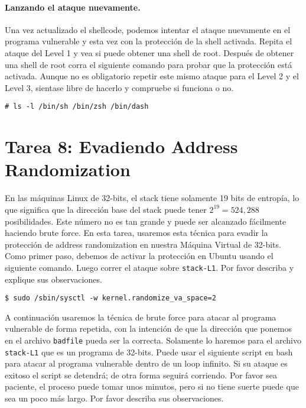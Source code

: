 \paragraph{Lanzando el ataque nuevamente.}
Una vez actualizado el shellcode, podemos intentar el ataque nuevamente en el programa vulnerable y esta vez con la protección de la shell activada. Repita el ataque del Level 1 y vea si puede obtener una shell de root. Después de obtener una shell de root corra el siguiente comando para probar que la protección está activada. Aunque no es obligatorio repetir este mismo ataque para el Level 2 y el Level 3, sientase libre de hacerlo y compruebe si funciona o no.

\begin{lstlisting}
# ls -l /bin/sh /bin/zsh /bin/dash
\end{lstlisting}
 


\section{Tarea 8: Evadiendo Address Randomization}

En las máquinas Linux de 32-bits, el stack tiene solamente 19 bits de entropía, lo que significa que la dirección base del stack puede tener  $2^{19} = 524,288$ posibilidades. Este número no es tan grande y puede ser alcanzado fácilmente haciendo brute force. En esta tarea, usaremos esta técnica para evadir la protección de address randomization en nuestra Máquina Virtual de 32-bits.
Como primer paso, debemos de activar la protección en Ubuntu usando el siguiente comando. Luego correr el ataque sobre \texttt{stack-L1}.
Por favor describa y explique sus observaciones.

\begin{lstlisting}
$ sudo /sbin/sysctl -w kernel.randomize_va_space=2
\end{lstlisting}

A continuación usaremos la técnica de brute force para atacar al programa vulnerable de forma repetida, con la intención de que la dirección que ponemos en el archivo  \texttt{badfile} pueda ser la correcta. Solamente lo haremos para el archivo \texttt{stack-L1} que es un programa de 32-bits.
Puede usar el siguiente script en bash para atacar al programa vulnerable dentro de un loop infinito. Si su ataque es exitoso el script se detendrá; de otra forma seguirá corriendo. Por favor sea paciente, el proceso puede tomar unos minutos, pero si no tiene suerte puede que sea un poco más largo. Por favor describa sus observaciones.


